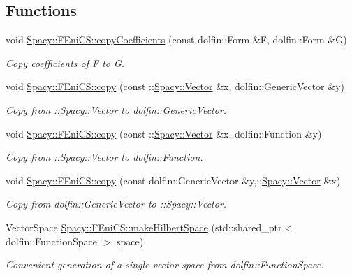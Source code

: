 \subsection*{Functions}
\begin{DoxyCompactItemize}
\item 
void \hyperlink{group__FenicsGroup_gab3d4c7c1e91a50e4e816598258b6edce}{Spacy\+::\+F\+Eni\+C\+S\+::copy\+Coefficients} (const dolfin\+::\+Form \&F, dolfin\+::\+Form \&G)
\begin{DoxyCompactList}\small\item\em Copy coefficients of F to G. \end{DoxyCompactList}\item 
void \hyperlink{group__FenicsGroup_ga7f43f0c660d0646adb031b453c536bb0}{Spacy\+::\+F\+Eni\+C\+S\+::copy} (const \+::\hyperlink{classSpacy_1_1Vector}{Spacy\+::\+Vector} \&x, dolfin\+::\+Generic\+Vector \&y)
\begin{DoxyCompactList}\small\item\em Copy from \+:\+:Spacy\+:\+:Vector to dolfin\+::\+Generic\+Vector. \end{DoxyCompactList}\item 
void \hyperlink{group__FenicsGroup_ga28fb1ebae29e07ec0256bb2331599aa7}{Spacy\+::\+F\+Eni\+C\+S\+::copy} (const \+::\hyperlink{classSpacy_1_1Vector}{Spacy\+::\+Vector} \&x, dolfin\+::\+Function \&y)
\begin{DoxyCompactList}\small\item\em Copy from \+:\+:Spacy\+:\+:Vector to dolfin\+::\+Function. \end{DoxyCompactList}\item 
void \hyperlink{group__FenicsGroup_ga61c5e45dbb789c155fbf86f8ec288f17}{Spacy\+::\+F\+Eni\+C\+S\+::copy} (const dolfin\+::\+Generic\+Vector \&y,\+::\hyperlink{classSpacy_1_1Vector}{Spacy\+::\+Vector} \&x)
\begin{DoxyCompactList}\small\item\em Copy from dolfin\+::\+Generic\+Vector to \+:\+:Spacy\+:\+:Vector. \end{DoxyCompactList}\item 
Vector\+Space \hyperlink{group__FenicsGroup_ga8b67cb3d0188d2398625595b79e2fa6a}{Spacy\+::\+F\+Eni\+C\+S\+::make\+Hilbert\+Space} (std\+::shared\+\_\+ptr$<$ dolfin\+::\+Function\+Space $>$ space)
\begin{DoxyCompactList}\small\item\em Convenient generation of a single vector space from dolfin\+::\+Function\+Space. \end{DoxyCompactList}\item 

\end{DoxyCompactItemize}
